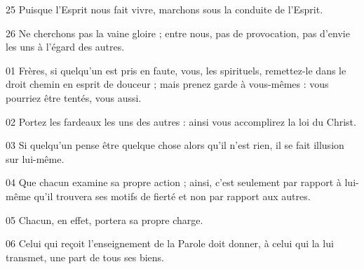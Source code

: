 25 Puisque l’Esprit nous fait vivre, marchons sous la conduite de l’Esprit.

26 Ne cherchons pas la vaine gloire ; entre nous, pas de provocation, pas d’envie les uns à l’égard des autres.

01 Frères, si quelqu’un est pris en faute, vous, les spirituels, remettez-le dans le droit chemin en esprit de douceur ; mais prenez garde à vous-mêmes : vous pourriez être tentés, vous aussi.

02 Portez les fardeaux les uns des autres : ainsi vous accomplirez la loi du Christ.

03 Si quelqu’un pense être quelque chose alors qu’il n’est rien, il se fait illusion sur lui-même.

04 Que chacun examine sa propre action ; ainsi, c’est seulement par rapport à lui-même qu’il trouvera ses motifs de fierté et non par rapport aux autres.

05 Chacun, en effet, portera sa propre charge.

06 Celui qui reçoit l’enseignement de la Parole doit donner, à celui qui la lui transmet, une part de tous ses biens.